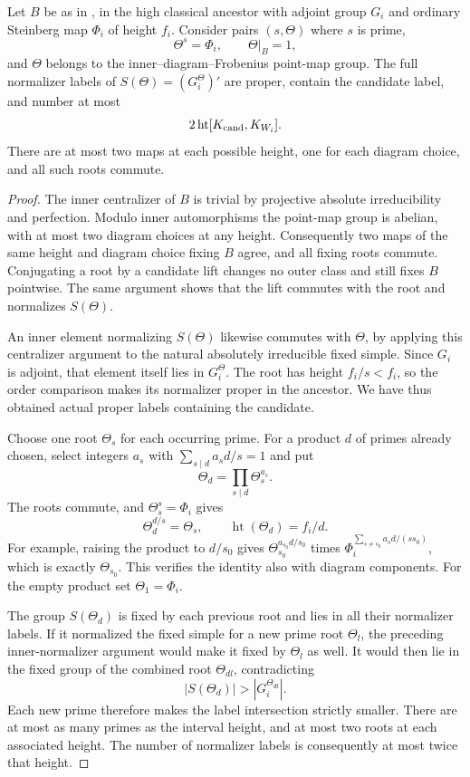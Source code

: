\begin{proposition}\label{w:root-count}
Let $B$ be as in , in the high classical ancestor with adjoint group $G_i$ and ordinary Steinberg map $\Phi_i$ of height $f_i$. Consider pairs $(s,\Theta)$ where $s$ is prime,
\[
 \Theta^s=\Phi_i,
 \qquad \Theta|_B=1,
\]
and $\Theta$ belongs to the inner--diagram--Frobenius point-map group. The full normalizer labels of $S(\Theta)=(G_i^\Theta)'$ are proper, contain the candidate label, and number at most
\[
 2\operatorname{ht}[K_{\rm cand},K_{W_i}].
\]
There are at most two maps at each possible height, one for each diagram choice, and all such roots commute.
\end{proposition}
\begin{proof}
The inner centralizer of $B$ is trivial by projective absolute
irreducibility and perfection. Modulo inner automorphisms the point-map
group is abelian, with at most two diagram choices at any height.
Consequently two maps of the same height and diagram choice fixing $B$
agree, and all fixing roots commute. Conjugating a root by a candidate
lift changes no outer class and still fixes $B$ pointwise. The same
argument shows that the lift commutes with the root and normalizes
$S(\Theta)$.

An inner element normalizing $S(\Theta)$ likewise commutes with $\Theta$,
by applying this centralizer argument to the natural absolutely
irreducible fixed simple. Since $G_i$ is adjoint, that element itself
lies in $G_i^\Theta$. The root has height $f_i/s<f_i$, so the order
comparison makes its normalizer proper in the ancestor. We have thus
obtained actual proper labels containing the candidate.

Choose one root $\Theta_s$ for each occurring prime. For a product $d$
of primes already chosen, select integers $a_s$ with
$\sum_{s\mid d}a_s d/s=1$ and put
\[
 \Theta_d=\prod_{s\mid d}\Theta_s^{a_s}.
\]
The roots commute, and $\Theta_s^s=\Phi_i$ gives
\[
 \Theta_d^{d/s}=\Theta_s,\qquad
 \operatorname{ht}(\Theta_d)=f_i/d.
\]
For example, raising the product to $d/s_0$ gives
$\Theta_{s_0}^{a_{s_0}d/s_0}$ times
$\Phi_i^{\sum_{s\ne s_0}a_s d/(ss_0)}$, which is exactly
$\Theta_{s_0}$. This verifies the identity also with diagram components.
For the empty product set $\Theta_1=\Phi_i$.

The group $S(\Theta_d)$ is fixed by each previous root and lies in all
their normalizer labels. If it normalized the fixed simple for a new
prime root $\Theta_l$, the preceding inner-normalizer argument would
make it fixed by $\Theta_l$ as well. It would then lie in the fixed group
of the combined root $\Theta_{dl}$, contradicting
\[
 |S(\Theta_d)|>|G_i^{\Theta_{dl}}|.
\]
Each new prime therefore makes the label intersection strictly smaller.
There are at most as many primes as the interval height, and at most
two roots at each associated height. The number of normalizer labels
is consequently at most twice that height.
\end{proof}

